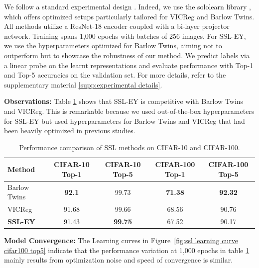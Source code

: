 We follow a standard experimental design \citep{tong2023emp}. Indeed, we use the sololearn library \citep{da2022solo}, which offers optimized setups particularly tailored for VICReg and Barlow Twins. All methods utilize a ResNet-18 encoder coupled with a bi-layer projector network. Training spans 1,000 epochs with batches of 256 images. For SSL-EY, we use the hyperparameters optimized for Barlow Twins, aiming not to outperform but to showcase the robustness of our method.
We predict labels via a linear probe on the learnt representations and evaluate performance with Top-1 and Top-5 accuracies on the validation set. For more details, refer to the supplementary material \ref{supp:experimental details}.

\textbf{Observations:} Table \ref{tab:selfsup} shows that SSL-EY is competitive with Barlow Twins and VICReg. This is remarkable because we used out-of-the-box hyperparameters for SSL-EY but used hyperparameters for Barlow Twins and VICReg that had been heavily optimized in previous studies.

\begin{table}
    \centering
    \begin{tabular}{lcccc}
        \hline
        Method          & CIFAR-10 Top-1 & CIFAR-10 Top-5 & CIFAR-100 Top-1 & CIFAR-100 Top-5 \\
        \hline
        Barlow Twins    & \textbf{92.1}  & 99.73          & \textbf{71.38}  & \textbf{92.32}  \\
        VICReg          & 91.68          & 99.66          & 68.56           & 90.76           \\
        \textbf{SSL-EY} & 91.43          & \textbf{99.75} & 67.52           & 90.17           \\
        \hline
    \end{tabular}
    \caption{Performance comparison of SSL methods on CIFAR-10 and CIFAR-100.}
    \label{tab:selfsup}
\end{table}

\textbf{Model Convergence:} The Learning curves in Figure~\ref{fig:ssl learning curve cifar100 top5} indicate that the performance variation at 1,000 epochs in table \ref{tab:selfsup} mainly results from optimization noise and speed of convergence is similar.


